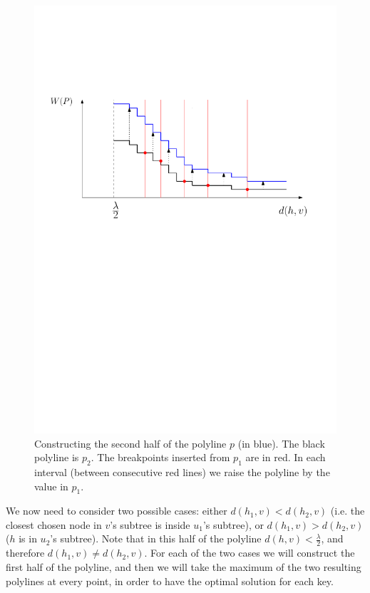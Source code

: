 \documentclass[11pt,a4paper]{article}
\theoremstyle{definition}
\theoremstyle{remark}
\begin{document}
\begin{figure}[h]
\begin{center}
\includegraphics[scale=.55]{new_polyline_second_half}
\end{center}
\caption{Constructing the second half of the polyline $p$ (in blue). The black polyline is $p_2$. The breakpoints inserted from $p_1$ are in red. In each interval (between consecutive red lines) we raise the polyline by the value in $p_1$.
\label{figure of constructing the second half of the polyline}}
\end{figure}

\vspace{0.04in}  We now need to consider two possible cases: either $d(h_1,v) < d(h_2,v)$ (i.e. the closest chosen node in $v$'s subtree is inside $u_1$'s subtree), or $d(h_1,v) > d(h_2,v)$ ($h$ is in $u_2$'s subtree). Note that in this half of the polyline $d(h,v)<\frac{\lambda}{2}$, and therefore $d(h_1,v) \neq d(h_2,v)$. For each of the two cases we will construct the first half of the polyline, and then we will take the maximum of the two resulting polylines at every point, in order to have the optimal solution for each key.
\end{document}
